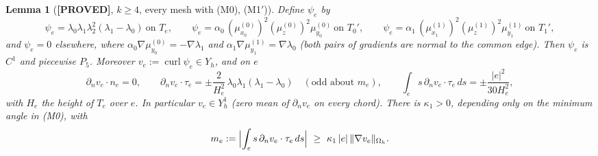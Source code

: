 \documentclass[11pt]{article}
\newtheorem{lemma}[theorem]{Lemma}
\theoremstyle{remark}
\newcommand{\Oh}{\Omega_h}
\newcommand{\Yh}{Y_h}
\newcommand{\norm}[1]{\|#1\|}
\newcommand{\dn}{\partial_n}
\newcommand{\lab}[1]{\textbf{[#1]}}
\begin{document}
\begin{lemma}[\lab{PROVED}, $k\ge4$, every mesh with (M0), (M1$'$)]\label{lem:field}
Define $\psi_e$ by
\[
\psi_e=\lambda_0\lambda_1\lambda_2^2(\lambda_1-\lambda_0)\ \text{on }T_e,\qquad
\psi_e=\alpha_0\,(\mu^{(0)}_{x_0})^2(\mu^{(0)}_z)^2\mu^{(0)}_{y_0}\ \text{on }T_0',\qquad
\psi_e=\alpha_1\,(\mu^{(1)}_{x_1})^2(\mu^{(1)}_z)^2\mu^{(1)}_{y_1}\ \text{on }T_1',
\]
and $\psi_e=0$ elsewhere, where $\alpha_0\nabla\mu^{(0)}_{y_0}=-\nabla\lambda_1$ and $\alpha_1\nabla\mu^{(1)}_{y_1}=\nabla\lambda_0$ (both pairs of gradients are normal to the common edge). Then $\psi_e$ is $C^1$ and piecewise $P_5$. Moreover $v_e:=\operatorname{curl}\psi_e\in\Yh$, and on $e$
\[
\dn v_e\cdot n_e=0,\qquad \dn v_e\cdot\tau_e=\pm\frac{2}{H_e^2}\,\lambda_0\lambda_1(\lambda_1-\lambda_0)\quad(\text{odd about }m_e),\qquad
\int_es\,\dn v_e\cdot\tau_e\,ds=\pm\frac{|e|^2}{30H_e^2},
\]
with $H_e$ the height of $T_e$ over $e$. In particular $v_e\in Y_h^1$ (zero mean of $\dn v_e$ on every chord). There is $\kappa_1>0$, depending only on the minimum angle in (M0), with
\[
m_e:=\Bigl|\int_es\,\dn v_e\cdot\tau_e\,ds\Bigr|\ \ge\ \kappa_1\,|e|\,\norm{\nabla v_e}_{\Oh}.
\]
\end{lemma}
\end{document}
